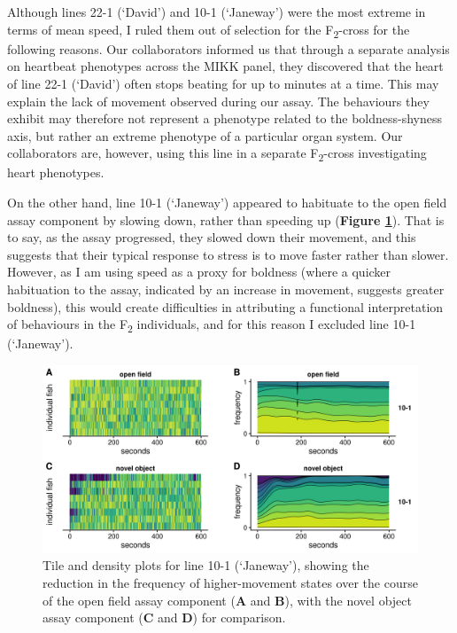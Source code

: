 \documentclass[
]{book}
\begin{document}
Although lines \textcolor{22-1 (‘David’)_FB737A}{22-1 (‘David’)} and \textcolor{10-1 (‘Janeway’)_F8766D}{10-1 (‘Janeway’)} were the most extreme in terms of mean speed, I ruled them out of selection for the F\textsubscript{2}-cross for the following reasons. Our collaborators informed us that through a separate analysis on heartbeat phenotypes across the MIKK panel, they discovered that the heart of line \textcolor{22-1 (‘David’)_FB737A}{22-1 (‘David’)} often stops beating for up to minutes at a time. This may explain the lack of movement observed during our assay. The behaviours they exhibit may therefore not represent a phenotype related to the boldness-shyness axis, but rather an extreme phenotype of a particular organ system. Our collaborators are, however, using this line in a separate F\textsubscript{2}-cross investigating heart phenotypes.

On the other hand, line \textcolor{10-1 (‘Janeway’)_F8766D}{10-1 (‘Janeway’)} appeared to habituate to the open field assay component by slowing down, rather than speeding up (\textbf{Figure \ref{fig:10-1-dens}}). That is to say, as the assay progressed, they slowed down their movement, and this suggests that their typical response to stress is to move faster rather than slower. However, as I am using speed as a proxy for boldness (where a quicker habituation to the assay, indicated by an increase in movement, suggests greater boldness), this would create difficulties in attributing a functional interpretation of behaviours in the F\textsubscript{2} individuals, and for this reason I excluded line \textcolor{10-1 (‘Janeway’)_F8766D}{10-1 (‘Janeway’)}.



\begin{figure}
\includegraphics[width=1\linewidth]{figs/mikk_behaviour/select_0.08_15_10-1_dge} \caption{Tile and density plots for line \textcolor{10-1 (‘Janeway’)_F8766D}{10-1 (‘Janeway’)}, showing the reduction in the frequency of higher-movement states over the course of the open field assay component (\textbf{A} and \textbf{B}), with the novel object assay component (\textbf{C} and \textbf{D}) for comparison.}\label{fig:10-1-dens}
\end{figure}
\end{document}

